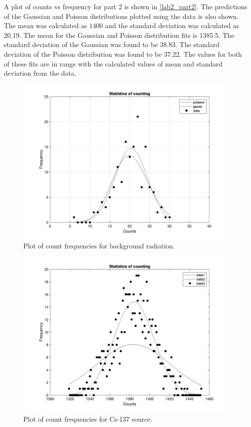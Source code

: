 \documentclass[reprint,amsmath,amssymb,aps,prl]{revtex4-2}
\begin{document}
A plot of counts vs frequency for part 2 is shown in \ref{lab2_part2}. The predictions of the Gaussian and Poisson distributions plotted using the data is also shown. The mean was calculated as $1400$ and the standard deviation was calculated as 20.19. The mean for the Gaussian and Poisson distribution fits is 1385.5. The standard deviation of the Gaussian was found to be $38.83$. The standard deviation of the Poisson distribution was found to be $37.22$. The  values for both of these fits are in range with the calculated values of mean and standard deviation from the data. 


\begin{figure}
    \centering
    \includegraphics[width = \columnwidth]{lab2_part1.jpg}
    \caption{Plot of count frequencies for background radiation.}
    \label{fig:lab2_part1}
\end{figure}


\begin{figure}
    \centering
    \includegraphics[width = \columnwidth]{lab2_part2.jpg}
    \caption{Plot of count frequencies for Cs-137 source.}
    \label{fig:lab2_part2}
\end{figure}
\end{document}
